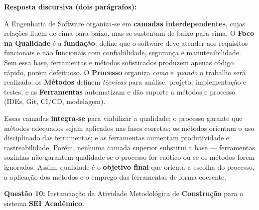 \documentclass[12pt,a4paper]{article}
\begin{document}
\begin{tcolorbox}[respostabox]
\textbf{Resposta discursiva (dois parágrafos):}

A Engenharia de Software organiza-se em \textbf{camadas interdependentes}, cujas relações fluem de cima para baixo, mas se sustentam de baixo para cima. O \textbf{Foco na Qualidade} é a \textbf{fundação}: define que o software deve atender aos requisitos funcionais e não funcionais com confiabilidade, segurança e manutenibilidade. Sem essa base, ferramentas e métodos sofisticados produzem apenas código rápido, porém defeituoso. O \textbf{Processo} organiza \textit{como} e \textit{quando} o trabalho será realizado; os \textbf{Métodos} definem \textit{técnicas} para análise, projeto, implementação e testes; e as \textbf{Ferramentas} automatizam e dão suporte a métodos e processo (IDEs, Git, CI/CD, modelagem).

Essas camadas \textbf{integra-se} para viabilizar a qualidade: o processo garante que métodos adequados sejam aplicados nas fases corretas; os métodos orientam o uso disciplinado das ferramentas; e as ferramentas aumentam produtividade e rastreabilidade. Porém, nenhuma camada superior substitui a base --- ferramentas sozinhas não garantem qualidade se o processo for caótico ou se os métodos forem ignorados. Assim, qualidade é o \textbf{objetivo final} que orienta a escolha do processo, a aplicação dos métodos e o emprego das ferramentas de forma coerente.
\end{tcolorbox}

\vspace{0.6cm}

\textbf{Questão 10:} Instanciação da Atividade Metodológica de \textbf{Construção} para o sistema \textbf{SEI Acadêmico}.
\end{document}
